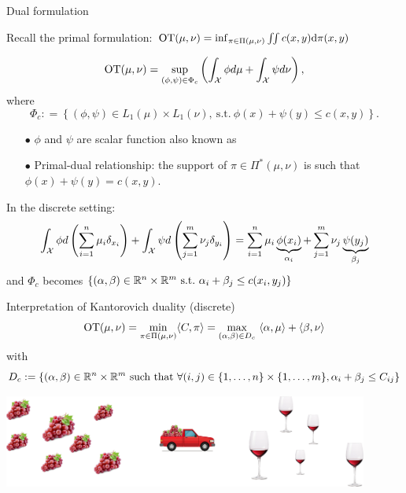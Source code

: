 \documentclass[pdf,aspectratio=169,10pt]{beamer}
\begin{document}
\begin{frame}{Dual formulation}

Recall the primal formulation: $\operatorname{OT}({\mu},{\nu}) = \inf _{\pi\in\Pi(\mu,\nu)} \iint c(x,y){\text d}\pi(x,y)$
\begin{block}{}
$$\operatorname{OT}({\mu},{\nu}) = \sup_{(\phi,\psi)\in\Phi_c} \left(\int_{{\mathcal X}} \phi d{\mu} + \int_{{\mathcal X}} \psi d{\nu}\right),$$
where
$$\Phi_c : = \left\{(\phi,\psi)\in L_1(\mu)\times L_1(\nu),\ \mbox{s.t.}\ \phi(x) + \psi(y)\leq c(x,y)\right\}.$$
\end{block}

{\vspace{0.3cm}\begin{itemize}
\item[$\bullet$] $\phi$ and $\psi$ are scalar function also known as 
\item[$\bullet$] Primal-dual relationship: the support of $\pi\in\Pi^{\ast}(\mu,\nu)$ is such that $\phi(x)+\psi(y) = c(x,y)$.
\end{itemize}}

{\vspace{0.3cm} In the discrete setting:
$$\int_{{\mathcal X}} \phi d\left({\sum_{i=1}^n\mu_i\delta_{x_i}}\right) + \int_{{\mathcal X}} \psi d\left({\sum_{j=1}^m\nu_j\delta_{y_i}}\right) = \sum_{i=1}^n\mu_i\underbrace{\phi(x_i)}_{\alpha_i} + \sum_{j=1}^m\nu_j\underbrace{\psi(y_j)}_{\beta_j}$$
and $\Phi_c$ becomes $\{(\alpha,\beta)\in\R^n\times\R^m \ \mbox{s.t.}\ \alpha_i+\beta_j\leq c(x_i,y_j)\}$
}

\end{frame}



\begin{frame}{Interpretation of Kantorovich duality (discrete)}
$$\operatorname{OT}({\mu},{\nu}) = \underset{\pi\in\Pi(\mu,\nu)}{\min} \langle C, \pi \rangle = \max_{(\alpha,\beta)\in D_c} \ \langle \alpha,{\mu}\rangle + \langle \beta, {\nu}\rangle$$
with
$$D_c := \{(\alpha,\beta)\in{\mathbb{R}}^n\times{\mathbb{R}}^m \ \mbox{such that}\ \forall (i,j)\in\{1,\ldots,n\}\times\{1,\ldots,m\}, \alpha_i+\beta_j\leq C_{ij}\}$$

\begin{center}
\includegraphics[width=0.9\textwidth]{../img/wine_load1.pdf}
\end{center}

\end{frame}
\end{document}
